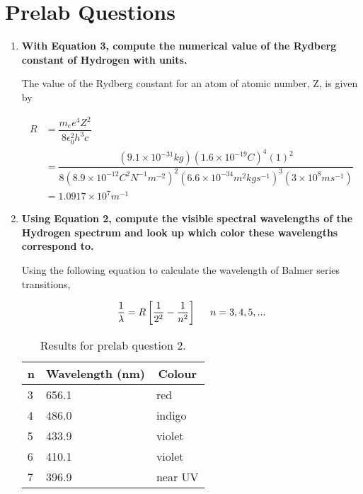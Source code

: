 \section{Prelab Questions}
\begin{enumerate}

\item {\bf With Equation 3, compute the numerical value of the Rydberg constant of Hydrogen with units.}\newline

The value of the Rydberg constant for an atom of atomic number, Z, is given by

\small
\begin{align}
R&=\dfrac{m_ee^4Z^2}{8\epsilon_0^2h^3c}\\
&=\dfrac{(9.1\times10^{-31}kg)(1.6\times10^{-19}C)^4(1)^2}{8(8.9\times10^{-12}C^2N^{-1}m^{-2})^2(6.6\times10^{-34}m^2kgs^{-1})^3(3\times10^8ms^{-1})}\\
&=1.0917\times10^{7}m^{-1}
\label{equ:spcg1}
\end{align}
\normalsize

\item {\bf Using Equation 2, compute the visible spectral wavelengths of the Hydrogen spectrum and look up which color these wavelengths correspond to.}\newline

Using the following equation to calculate the wavelength of Balmer series transitions,

\begin{equation}
\dfrac{1}{\lambda}=R\left[\dfrac{1}{2^2}-\dfrac{1}{n^2}\right] \hspace{5mm}n=3,4,5,...
\label{equ:spcg2}
\end{equation}

\begin{table}[ht]
\center
\begin{tabular}{|l|l|l|}
\hline
\multicolumn{1}{|c|}{n} & \multicolumn{1}{c|}{Wavelength (nm)} & \multicolumn{1}{c|}{Colour} \\ \hline
3                       & 656.1                                & red                         \\ \hline
4                       & 486.0                                & indigo                      \\ \hline
5                       & 433.9                                & violet                      \\ \hline
6                       & 410.1                                & violet                      \\ \hline
7                       & 396.9                                & near UV                     \\ \hline
\end{tabular}
\caption{Results for prelab question 2.}
\label{tab:spcg1}
\end{table}


\end{enumerate}

